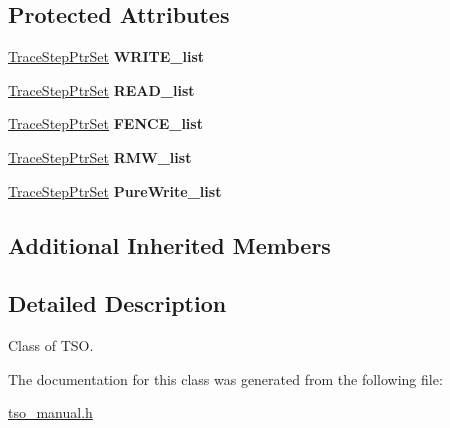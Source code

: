 \subsection*{Protected Attributes}
\begin{DoxyCompactItemize}
\item 
\mbox{\label{classilang_1_1_tso_a77a6f54cb0059c4e54490dc0f55d4ced}} 
\mbox{\hyperlink{classilang_1_1_memory_model_adf275c2b36d17acd5b6e782c1eca7f92}{Trace\+Step\+Ptr\+Set}} {\bfseries W\+R\+I\+T\+E\+\_\+list}
\item 
\mbox{\label{classilang_1_1_tso_a2afda787de95f2ebe9ed5ad1ae8ef126}} 
\mbox{\hyperlink{classilang_1_1_memory_model_adf275c2b36d17acd5b6e782c1eca7f92}{Trace\+Step\+Ptr\+Set}} {\bfseries R\+E\+A\+D\+\_\+list}
\item 
\mbox{\label{classilang_1_1_tso_a0dbdf741def39d550ea5c01f0427eeb4}} 
\mbox{\hyperlink{classilang_1_1_memory_model_adf275c2b36d17acd5b6e782c1eca7f92}{Trace\+Step\+Ptr\+Set}} {\bfseries F\+E\+N\+C\+E\+\_\+list}
\item 
\mbox{\label{classilang_1_1_tso_ae014119bb77ee3aac6fd9ac3cc3e7c9a}} 
\mbox{\hyperlink{classilang_1_1_memory_model_adf275c2b36d17acd5b6e782c1eca7f92}{Trace\+Step\+Ptr\+Set}} {\bfseries R\+M\+W\+\_\+list}
\item 
\mbox{\label{classilang_1_1_tso_aa3c99cc8fcadf328e936a90b73ac3ab9}} 
\mbox{\hyperlink{classilang_1_1_memory_model_adf275c2b36d17acd5b6e782c1eca7f92}{Trace\+Step\+Ptr\+Set}} {\bfseries Pure\+Write\+\_\+list}
\end{DoxyCompactItemize}
\subsection*{Additional Inherited Members}


\subsection{Detailed Description}
Class of T\+SO. 

The documentation for this class was generated from the following file\+:\begin{DoxyCompactItemize}
\item 
\mbox{\hyperlink{tso__manual_8h}{tso\+\_\+manual.\+h}}\end{DoxyCompactItemize}
